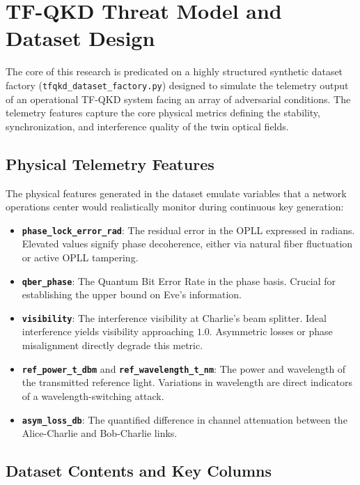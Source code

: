 \documentclass[conference]{IEEEtran}
\begin{document}
\section{TF-QKD Threat Model and Dataset Design}

The core of this research is predicated on a highly structured synthetic dataset factory (\texttt{tfqkd\_dataset\_factory.py}) designed to simulate the telemetry output of an operational TF-QKD system facing an array of adversarial conditions. The telemetry features capture the core physical metrics defining the stability, synchronization, and interference quality of the twin optical fields.

\subsection{Physical Telemetry Features}
The physical features generated in the dataset emulate variables that a network operations center would realistically monitor during continuous key generation:
\begin{itemize}
    \item \textbf{\texttt{phase\_lock\_error\_rad}}: The residual error in the OPLL expressed in radians. Elevated values signify phase decoherence, either via natural fiber fluctuation or active OPLL tampering.
    \item \textbf{\texttt{qber\_phase}}: The Quantum Bit Error Rate in the phase basis. Crucial for establishing the upper bound on Eve's information.
    \item \textbf{\texttt{visibility}}: The interference visibility at Charlie's beam splitter. Ideal interference yields visibility approaching $1.0$. Asymmetric losses or phase misalignment directly degrade this metric.
    \item \textbf{\texttt{ref\_power\_t\_dbm}} and \textbf{\texttt{ref\_wavelength\_t\_nm}}: The power and wavelength of the transmitted reference light. Variations in wavelength are direct indicators of a wavelength-switching attack.
    \item \textbf{\texttt{asym\_loss\_db}}: The quantified difference in channel attenuation between the Alice-Charlie and Bob-Charlie links.
\end{itemize}

\subsection{Dataset Contents and Key Columns}
\end{document}
